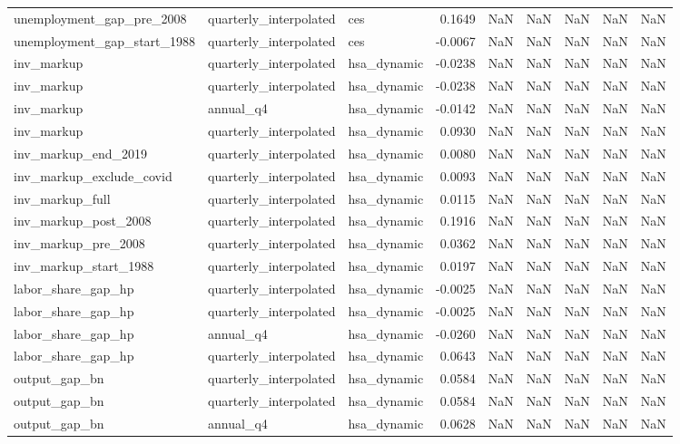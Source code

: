 \begin{tabular}{lllrrrrrr}
unemployment\_gap\_pre\_2008 & quarterly\_interpolated & ces & 0.1649 & NaN & NaN & NaN & NaN & NaN \\
unemployment\_gap\_start\_1988 & quarterly\_interpolated & ces & -0.0067 & NaN & NaN & NaN & NaN & NaN \\
inv\_markup & quarterly\_interpolated & hsa\_dynamic & -0.0238 & NaN & NaN & NaN & NaN & NaN \\
inv\_markup & quarterly\_interpolated & hsa\_dynamic & -0.0238 & NaN & NaN & NaN & NaN & NaN \\
inv\_markup & annual\_q4 & hsa\_dynamic & -0.0142 & NaN & NaN & NaN & NaN & NaN \\
inv\_markup & quarterly\_interpolated & hsa\_dynamic & 0.0930 & NaN & NaN & NaN & NaN & NaN \\
inv\_markup\_end\_2019 & quarterly\_interpolated & hsa\_dynamic & 0.0080 & NaN & NaN & NaN & NaN & NaN \\
inv\_markup\_exclude\_covid & quarterly\_interpolated & hsa\_dynamic & 0.0093 & NaN & NaN & NaN & NaN & NaN \\
inv\_markup\_full & quarterly\_interpolated & hsa\_dynamic & 0.0115 & NaN & NaN & NaN & NaN & NaN \\
inv\_markup\_post\_2008 & quarterly\_interpolated & hsa\_dynamic & 0.1916 & NaN & NaN & NaN & NaN & NaN \\
inv\_markup\_pre\_2008 & quarterly\_interpolated & hsa\_dynamic & 0.0362 & NaN & NaN & NaN & NaN & NaN \\
inv\_markup\_start\_1988 & quarterly\_interpolated & hsa\_dynamic & 0.0197 & NaN & NaN & NaN & NaN & NaN \\
labor\_share\_gap\_hp & quarterly\_interpolated & hsa\_dynamic & -0.0025 & NaN & NaN & NaN & NaN & NaN \\
labor\_share\_gap\_hp & quarterly\_interpolated & hsa\_dynamic & -0.0025 & NaN & NaN & NaN & NaN & NaN \\
labor\_share\_gap\_hp & annual\_q4 & hsa\_dynamic & -0.0260 & NaN & NaN & NaN & NaN & NaN \\
labor\_share\_gap\_hp & quarterly\_interpolated & hsa\_dynamic & 0.0643 & NaN & NaN & NaN & NaN & NaN \\
output\_gap\_bn & quarterly\_interpolated & hsa\_dynamic & 0.0584 & NaN & NaN & NaN & NaN & NaN \\
output\_gap\_bn & quarterly\_interpolated & hsa\_dynamic & 0.0584 & NaN & NaN & NaN & NaN & NaN \\
output\_gap\_bn & annual\_q4 & hsa\_dynamic & 0.0628 & NaN & NaN & NaN & NaN & NaN \\

\end{tabular}
